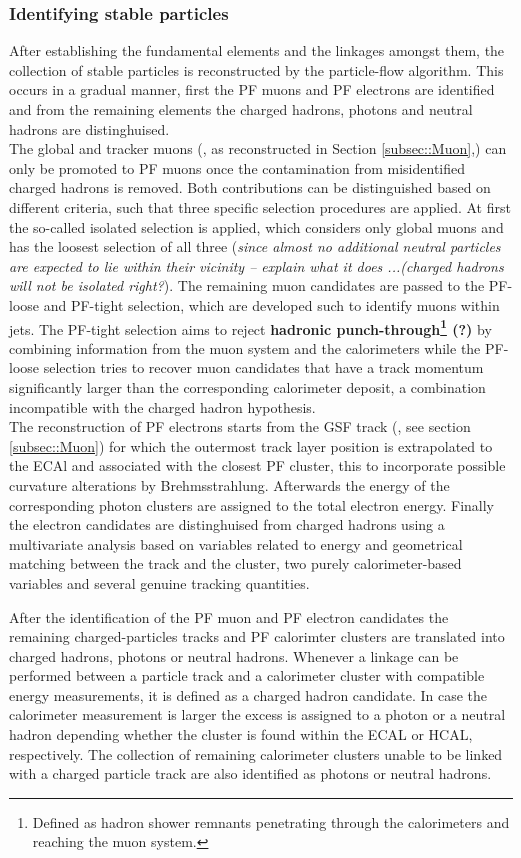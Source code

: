 \subsubsection*{Identifying stable particles}
After establishing the fundamental elements and the linkages amongst them, the collection of stable particles is reconstructed by the particle-flow algorithm. This occurs in a gradual manner, first the PF muons and PF electrons are identified and from the remaining elements the charged hadrons, photons and neutral hadrons are distinghuised.
\\
The global and tracker muons (, as reconstructed in Section \ref{subsec::Muon},) can only be promoted to PF muons once the contamination from misidentified charged hadrons is removed.
Both contributions can be distinguished based on different criteria, such that three specific selection procedures are applied.
At first the so-called isolated selection is applied, which considers only global muons and has the loosest selection of all three (\textit{since almost no additional neutral particles are expected to lie within their vicinity -- explain what it does ...(charged hadrons will not be isolated right?}). 
The remaining muon candidates are passed to the PF-loose and PF-tight selection, which are developed such to identify muons within jets. The PF-tight selection aims to reject \textbf{hadronic punch-through\footnote{Defined as hadron shower remnants penetrating through the calorimeters and reaching the muon system.} (?)} by combining information from the muon system and the calorimeters while the PF-loose selection tries to recover muon candidates that have a track momentum significantly larger than the corresponding calorimeter deposit, a combination incompatible with the charged hadron hypothesis.
\\
The reconstruction of PF electrons starts from the GSF track (, see section \ref{subsec::Muon}) for which the outermost track layer position is extrapolated to the ECAl and associated with the closest PF cluster, this to incorporate possible curvature alterations by Brehmsstrahlung.
Afterwards the energy of the corresponding photon clusters are assigned to the total electron energy. Finally the electron candidates are distinghuised from charged hadrons using a multivariate analysis based on variables related to energy and geometrical matching between the track and the cluster, two purely calorimeter-based variables and several genuine tracking quantities.

After the identification of the PF muon and PF electron candidates the remaining charged-particles tracks and PF calorimter clusters are translated into charged hadrons, photons or neutral hadrons.
Whenever a linkage can be performed between a particle track and a calorimeter cluster with compatible energy measurements, it is defined as a charged hadron candidate. In case the calorimeter measurement is larger the excess is assigned to a photon or a neutral hadron depending whether the cluster is found within the ECAL or HCAL, respectively.
The collection of remaining calorimeter clusters unable to be linked with a charged particle track are also identified as photons or neutral hadrons.

